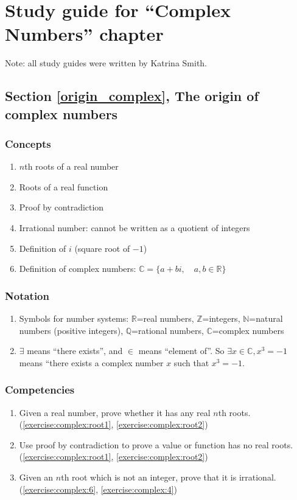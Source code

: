 \section{Study guide  for ``Complex Numbers''  chapter}\label{sec:complex:study} 

Note: all study guides were written by Katrina Smith.

\subsection*{Section \ref{origin_complex}, The origin of complex numbers}
\subsubsection*{Concepts}
\begin{enumerate}
\item 
$n$th roots of a real number
\item
Roots of a real function
\item
Proof by contradiction
\item
Irrational number: cannot be written as a quotient of integers
\item
Definition of $i$ (square root of $-1$)
\item
Definition of complex numbers:  $\mathbb{C}=\{a+bi, \quad a,b \in \mathbb{R} \}$
\end{enumerate}

\subsubsection*{Notation}
\begin{enumerate}
\item
Symbols for number systems: $\mathbb{R}$=real numbers, $\mathbb{Z}$=integers, $\mathbb{N}$=natural numbers (positive integers), $\mathbb{Q}$=rational numbers, $\mathbb{C}$=complex numbers
\item $\exists$ means ``there exists'',  and $\in$ means ``element of''. So $\exists x \in \mathbb{C}, x^3 = -1$ means ``there exists a complex number $x$ such that $x^3=-1$.
\end{enumerate}

\subsubsection*{Competencies}
\begin{enumerate}
\item
Given a real number, prove whether it has any real $n$th roots.  (\ref{exercise:complex:root1}, \ref{exercise:complex:root2}) 
\item
Use proof by contradiction to prove a value or function has no real roots. (\ref{exercise:complex:root1}, \ref{exercise:complex:root2})
\item	
Given an $n$th root which is not an integer, prove that it is irrational. (\ref{exercise:complex:6}, \ref{exercise:complex:4})
\end{enumerate}


